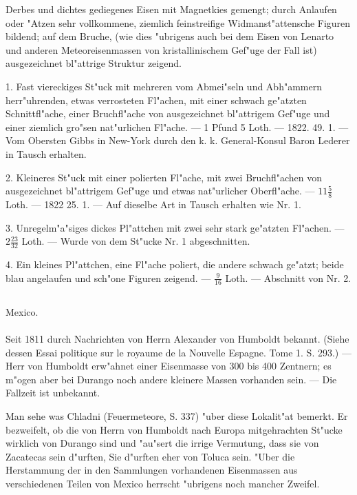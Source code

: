 \documentclass[a4paper, 11pt, oneside, polutonikogreek, german]{article}
\begin{document}
\setlength{\leftskip}{0pt}
\setlength{\parindent}{20pt}

Derbes und dichtes gediegenes Eisen mit Magnetkies gemengt; durch Anlaufen oder "Atzen sehr vollkommene, ziemlich feinstreifige Widmanst"attensche Figuren bildend; auf dem Bruche, (wie dies "ubrigens auch bei dem Eisen von Lenarto und anderen Meteoreisenmassen von kristallinischem Gef"uge der Fall ist) ausgezeichnet bl"attrige Struktur zeigend.

1. Fast viereckiges St"uck mit mehreren vom Abmei"seln und Abh"ammern herr"uhrenden, etwas verrosteten Fl"achen, mit einer schwach ge"atzten Schnittfl"ache, einer Bruchfl"ache von ausgezeichnet bl"attrigem Gef"uge und einer ziemlich gro"sen nat"urlichen Fl"ache. --- 1 Pfund 5 Loth. --- 1822. 49. 1. --- Vom Obersten Gibbs in New-York durch den k. k. General-Konsul Baron Lederer in Tausch erhalten.

2. Kleineres St"uck mit einer polierten Fl"ache, mit zwei Bruchfl"achen von ausgezeichnet bl"attrigem Gef"uge und etwas nat"urlicher Oberfl"ache. --- $11\frac{5}{8}$ Loth. --- 1822 25. 1. --- Auf dieselbe Art in Tausch erhalten wie Nr. 1.

3. Unregelm"a"siges dickes Pl"attchen mit zwei sehr stark ge"atzten Fl"achen. --- $2\frac{23}{32}$ Loth. --- Wurde von dem St"ucke Nr. 1 abgeschnitten.

4. Ein kleines Pl"attchen, eine Fl"ache poliert, die andere schwach ge"atzt; beide blau angelaufen und sch"one Figuren zeigend. --- $\frac{9}{16}$ Loth. --- Abschnitt von Nr. 2.
\subsection{}
\begin{center}

Mexico.
\end{center}
\paragraph{}
Seit 1811 durch Nachrichten von Herrn Alexander von Humboldt bekannt. (Siehe dessen Essai politique sur le royaume de la Nouvelle Espagne. Tome 1. S. 293.) --- Herr von Humboldt erw"ahnet einer Eisenmasse von 300 bis 400 Zentnern; es m"ogen aber bei Durango noch andere kleinere Massen vorhanden sein. --- Die Fallzeit ist unbekannt.

\setlength{\leftskip}{10mm}
\setlength{\parindent}{0pt}

{\footnotesize Man sehe was Chladni (Feuermeteore, S. 337) "uber diese Lokalit"at bemerkt. Er bezweifelt, ob die von Herrn von Humboldt nach Europa mitgehrachten St"ucke wirklich von Durango sind und "au"sert die irrige Vermutung, dass sie von Zacatecas sein d"urften, Sie d"urften eher von Toluca sein. "Uber die Herstammung der in den Sammlungen vorhandenen Eisenmassen aus verschiedenen Teilen von Mexico herrscht "ubrigens noch mancher Zweifel.}
\end{document}
